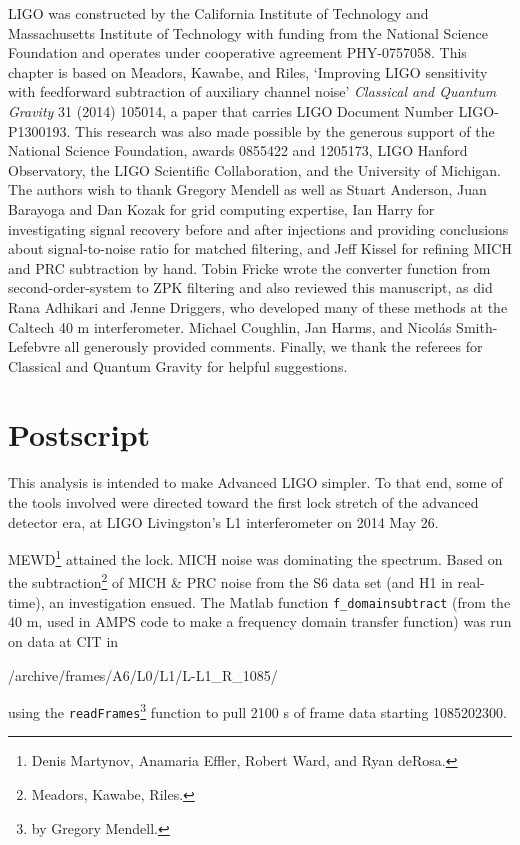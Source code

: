 LIGO was constructed by the California Institute of Technology and Massachusetts Institute of Technology with funding from the National Science Foundation and operates under cooperative agreement PHY-0757058. This chapter is based on Meadors, Kawabe, and Riles, `Improving LIGO sensitivity with feedforward subtraction of auxiliary channel noise' \textit{Classical and Quantum Gravity} 31 (2014) 105014, a paper that carries LIGO Document Number LIGO-P1300193. This research was also made possible by the generous support of the National Science Foundation, awards 0855422 and 1205173, LIGO Hanford Observatory, the LIGO Scientific Collaboration, and the University of Michigan. The authors wish to thank Gregory Mendell as well as Stuart Anderson, Juan Barayoga and Dan Kozak for grid computing expertise, Ian Harry for investigating signal recovery before and after injections and providing conclusions about signal-to-noise ratio for matched filtering, and Jeff Kissel for refining MICH and PRC subtraction by hand. Tobin Fricke wrote the converter function from second-order-system to ZPK filtering and also reviewed this manuscript, as did Rana Adhikari and Jenne Driggers, who developed many of these methods at the Caltech 40 m interferometer. Michael Coughlin, Jan Harms, and Nicol\'{a}s Smith-Lefebvre all generously provided comments. Finally, we thank the referees for Classical and Quantum Gravity for helpful suggestions.

\section{Postscript}

This analysis is intended to make Advanced LIGO simpler. To that end, some of the tools involved were directed toward the first lock stretch of the advanced detector era, at LIGO Livingston's L1 interferometer on 2014 May 26.

MEWD\footnote{Denis Martynov, Anamaria Effler, Robert Ward, and Ryan deRosa.} attained the lock. MICH noise was dominating the spectrum. Based on the subtraction\footnote{Meadors, Kawabe, Riles.} of MICH \& PRC noise from the S6 data set (and H1 in real-time), an investigation ensued.
The Matlab function \texttt{f\_domainsubtract} (from the 40 m, used in AMPS code to make a frequency domain transfer function) was run on data at CIT in

/archive/frames/A6/L0/L1/L-L1\_R\_1085/

using the \texttt{readFrames}\footnote{by Gregory Mendell.} function to pull 2100 s of frame data starting 1085202300.

